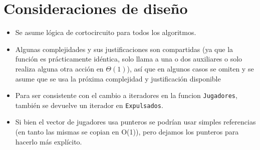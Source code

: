 \section{Consideraciones de diseño}

\begin{itemize}
	\item Se asume lógica de cortocircuito para todos los algoritmos.

	\item Algunas complejidades y sus justificaciones son compartidas (ya que la función es prácticamente idéntica, solo llama a una o dos auxiliares o solo realiza alguna otra acción en $\Theta(1)$), así que en algunos casos se omiten y se asume que se usa la próxima complejidad y justificación disponible

	\item Para ser consistente con el cambio a iteradores en la funcion \texttt{Jugadores}, también se devuelve un iterador en \texttt{Expulsados}.

	\item Si bien el vector de jugadores usa punteros se podrían usar simples referencias (en tanto las mismas se copian en O(1)), pero dejamos los punteros para hacerlo más explícito.

\end{itemize}